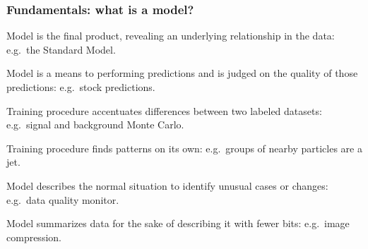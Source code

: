 \documentclass[compress]{beamer}
\begin{document}
\begin{frame}
\frametitle{Fundamentals: what is a model?}
\begin{description}
\item<1->[Descriptive:] Model is the final product, revealing an underlying relationship in the data: e.g.\ the Standard Model.
\item<1->[Predictive:] Model is a means to performing predictions and is judged on the quality of those predictions: e.g.\ stock predictions.
\item<2->[Supervised:] Training procedure accentuates differences between two labeled datasets: e.g.\ signal and background Monte Carlo.
\item<2->[Unsupervised:] Training procedure finds patterns on its own: e.g.\ groups of nearby particles are a jet.
\item<3->[Anomaly detection:] Model describes the normal situation to identify unusual cases or changes: e.g.\ data quality monitor.
\item<3->[Data compression:] Model summarizes data for the sake of describing it with fewer bits: e.g.\ image compression.
\end{description}
\end{frame}
\end{document}
